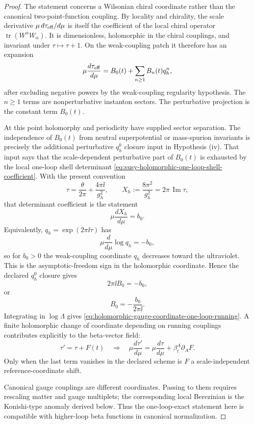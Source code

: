 \begin{proof}
The statement concerns a Wilsonian chiral coordinate rather than the canonical
two-point-function coupling.  By locality and chirality, the scale derivative
\(\mu\,d\tau_{\rm eff}/d\mu\) is itself the coefficient of the local chiral
operator \(\operatorname{tr}(W^\alpha W_\alpha)\).  It is dimensionless,
holomorphic in the chiral couplings, and invariant under
\(\tau\mapsto\tau+1\).  On the weak-coupling patch it therefore has an
expansion
\begin{equation}
  \mu\frac{d\tau_{\rm eff}}{d\mu}
  =
  B_0(t)+\sum_{n\geq1}B_n(t)q_h^n ,
  \label{eq:holomorphic-gauge-beta-q-expansion}
\end{equation}
after excluding negative powers by the weak-coupling regularity hypothesis.
The \(n\geq1\) terms are nonperturbative instanton sectors.  The perturbative
projection is the constant term \(B_0(t)\).

At this point holomorphy and periodicity have supplied sector separation.  The
independence of \(B_0(t)\) from neutral superpotential or mass-spurion
invariants is precisely the additional perturbative \(q_h^0\) closure input in
Hypothesis (iv).  That input says that the scale-dependent perturbative part
of \(B_0(t)\) is exhausted by the local one-loop shell determinant
\eqref{eq:susy-holomorphic-one-loop-shell-coefficient}.  With the present
convention
\[
  \tau=\frac{\theta}{2\pi}+\frac{4\pi\ii}{g_h^2},
  \qquad
  X_h:=\frac{8\pi^2}{g_h^2}=2\pi\,\operatorname{Im}\tau ,
\]
that determinant coefficient is the statement
\[
  \mu\frac{dX_h}{d\mu}=b_0 .
\]
Equivalently, \(q_h=\exp(2\pi\ii\tau)\) has
\[
  \mu\frac{d}{d\mu}\log q_h=-b_0 ,
\]
so for \(b_0>0\) the weak-coupling coordinate \(q_h\) decreases toward the
ultraviolet.  This is the asymptotic-freedom sign in the holomorphic
coordinate.  Hence the declared \(q_h^0\) closure gives
\[
  2\pi\ii B_0=-b_0,
\]
or
\[
  B_0=-\frac{b_0}{2\pi\ii}.
\]
Integrating in \(\log\Lambda\) gives
\eqref{eq:holomorphic-gauge-coordinate-one-loop-running}.  A finite
holomorphic change of coordinate depending on running couplings contributes
explicitly to the beta-vector field:
\[
  \tau'=\tau+F(t)
  \quad\Longrightarrow\quad
  \mu\frac{d\tau'}{d\mu}
  =
  \mu\frac{d\tau}{d\mu}
  +
  \beta_t^A\partial_A F .
\]
Only when the last term vanishes in the declared scheme is \(F\) a
scale-independent reference-coordinate shift.

Canonical gauge couplings are different coordinates.  Passing to them
requires rescaling matter and gauge multiplets; the corresponding local
Berezinian is the Konishi-type anomaly derived below.  Thus the
one-loop-exact statement here is compatible with higher-loop beta functions
in canonical normalization.
\end{proof}

